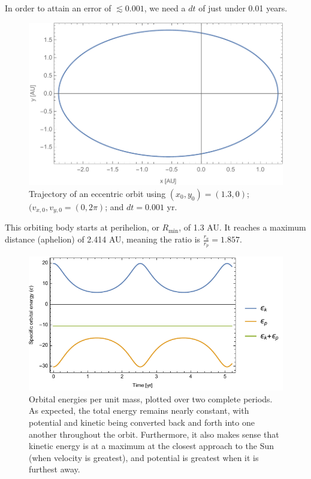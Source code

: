 \documentclass{article}
\begin{document}
In order to attain an error of $\lesssim0.001$, we need a $dt$ of just under 0.01 years.

\newpage
\bigskip
{}
\medskip

\begin{figure}[h!]
    \centering
    \includegraphics[width=5in]{homework3/q3_orbit.pdf}
    \caption{Trajectory of an eccentric orbit using $(x_0,y_0)=(1.3,0)$; $(v_{x,0},v_{y,0}=(0,2\pi)$; and $dt=0.001$ yr.}
    \label{fig:q3orbit}
\end{figure}

This orbiting body starts at perihelion, or $R_\text{min}$, of 1.3 AU. It reaches a maximum distance (aphelion) of 2.414 AU, meaning the ratio is $\frac{r_a}{r_p}=1.857$.

\begin{figure}[h!]
    \centering
    \includegraphics[width=5in]{homework3/q3energy.pdf}
    \caption{Orbital energies per unit mass, plotted over two complete periods. As expected, the total energy remains nearly constant, with potential and kinetic being converted back and forth into one another throughout the orbit. Furthermore, it also makes sense that kinetic energy is at a maximum at the closest approach to the Sun (when velocity is greatest), and potential is greatest when it is furthest away.}
    \label{fig:q3energy}
\end{figure}
\end{document}
